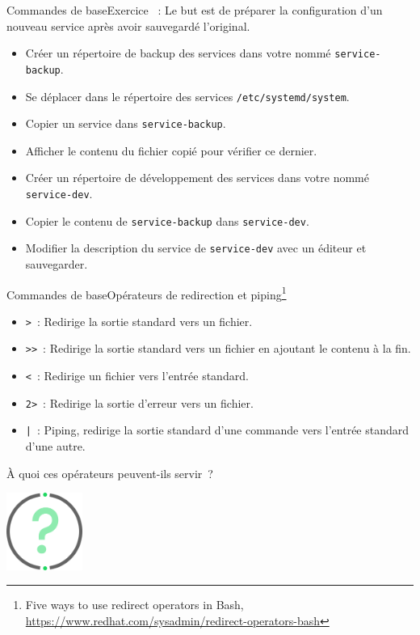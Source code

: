 \documentclass{beamer}
\begin{document}
    \begin{frame}{Commandes de base}{Exercice \execcounterdispinc{}~:}
        Le but est de préparer la configuration d'un nouveau service après avoir sauvegardé l'original.
        \begin{itemize}
            \item Créer un répertoire de backup des services dans votre  nommé \lstinline{service-backup}.
            \item Se déplacer dans le répertoire des services \lstinline{/etc/systemd/system}.
            \item Copier un service dans \lstinline{service-backup}.
            \item Afficher le contenu du fichier copié pour vérifier ce dernier.
            \item Créer un répertoire de développement des services dans votre  nommé \lstinline{service-dev}.
            \item Copier le contenu de \lstinline{service-backup} dans \lstinline{service-dev}.
            \item Modifier la description du service de \lstinline{service-dev} avec un éditeur et sauvegarder.
        \end{itemize}
    \end{frame}

    \begin{frame}{Commandes de base}{Opérateurs de redirection et piping\footnote{Five ways to use redirect operators in Bash, \url{https://www.redhat.com/sysadmin/redirect-operators-bash}}}
        \begin{itemize}
            \item \lstinline{>}~: Redirige la sortie standard vers un fichier.
            \item \lstinline{>>}~: Redirige la sortie standard vers un fichier en ajoutant le contenu à la fin.
            \item \lstinline{<}~: Redirige un fichier vers l'entrée standard.
            \item \lstinline{2>}~: Redirige la sortie d'erreur vers un fichier.
            \item \lstinline{|}~: Piping, redirige la sortie standard d'une commande vers l'entrée standard d'une autre.
        \end{itemize}
        À quoi ces opérateurs peuvent-ils servir~?
        \begin{center}
            \includegraphics[width=2.5cm]{image/question-mark}
        \end{center}
    \end{frame}
\end{document}
